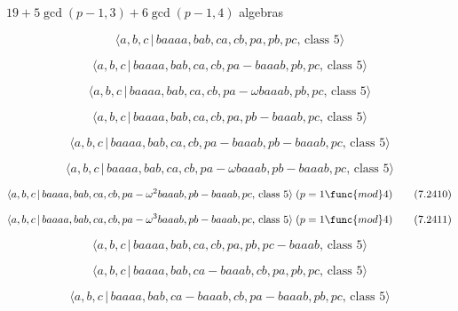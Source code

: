 \documentclass[10pt]{article}
\begin{document}
$19+5\gcd (p-1,3)+6\gcd (p-1,4)$ algebras

\begin{equation}
\langle a,b,c\,|\,baaaa,bab,ca,cb,pa,pb,pc,\,\text{class }5\rangle 
\tag{7.2404}
\end{equation}

\begin{equation}
\langle a,b,c\,|\,baaaa,bab,ca,cb,pa-baaab,pb,pc,\,\text{class }5\rangle 
\tag{7.2405}
\end{equation}

\begin{equation}
\langle a,b,c\,|\,baaaa,bab,ca,cb,pa-\omega baaab,pb,pc,\,\text{class }%
5\rangle  \tag{7.2406}
\end{equation}

\begin{equation}
\langle a,b,c\,|\,baaaa,bab,ca,cb,pa,pb-baaab,pc,\,\text{class }5\rangle 
\tag{7.2407}
\end{equation}

\begin{equation}
\langle a,b,c\,|\,baaaa,bab,ca,cb,pa-baaab,pb-baaab,pc,\,\text{class }%
5\rangle  \tag{7.2408}
\end{equation}

\begin{equation}
\langle a,b,c\,|\,baaaa,bab,ca,cb,pa-\omega baaab,pb-baaab,pc,\,\text{class }%
5\rangle  \tag{7.2409}
\end{equation}

\begin{equation}
\langle a,b,c\,|\,baaaa,bab,ca,cb,pa-\omega ^{2}baaab,pb-baaab,pc,\,\text{%
class }5\rangle \;(p=1\func{mod}4)  \tag{7.2410}
\end{equation}

\begin{equation}
\langle a,b,c\,|\,baaaa,bab,ca,cb,pa-\omega ^{3}baaab,pb-baaab,pc,\,\text{%
class }5\rangle \;(p=1\func{mod}4)  \tag{7.2411}
\end{equation}

\begin{equation}
\langle a,b,c\,|\,baaaa,bab,ca,cb,pa,pb,pc-baaab,\,\text{class }5\rangle 
\tag{7.2412}
\end{equation}

\begin{equation}
\langle a,b,c\,|\,baaaa,bab,ca-baaab,cb,pa,pb,pc,\,\text{class }5\rangle 
\tag{7.2413}
\end{equation}

\begin{equation}
\langle a,b,c\,|\,baaaa,bab,ca-baaab,cb,pa-baaab,pb,pc,\,\text{class }%
5\rangle  \tag{7.2414}
\end{equation}
\end{document}
